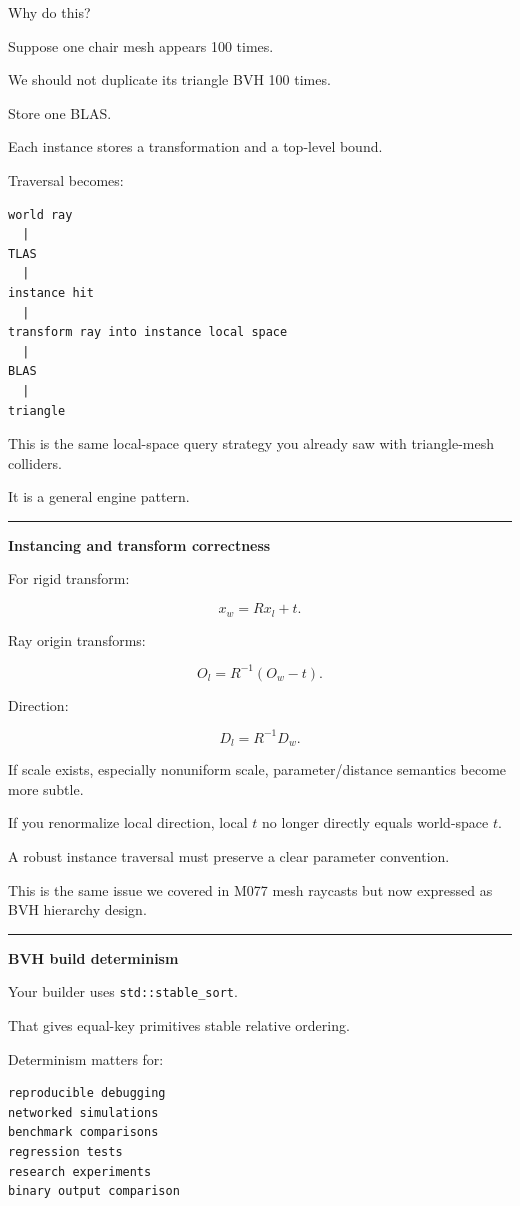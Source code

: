 Why do this?

Suppose one chair mesh appears 100 times.

We should not duplicate its triangle BVH 100 times.

Store one BLAS.

Each instance stores a transformation and a top-level bound.

Traversal becomes:

\begin{verbatim}
world ray
  |
TLAS
  |
instance hit
  |
transform ray into instance local space
  |
BLAS
  |
triangle
\end{verbatim}

This is the same local-space query strategy you already saw with triangle-mesh colliders.

It is a general engine pattern.

\begin{center}\rule{0.5\linewidth}{0.5pt}\end{center}

\textbf{Instancing and transform correctness}

For rigid transform:

\[
x_w=Rx_l+t.
\]

Ray origin transforms:

\[
O_l=R^{-1}(O_w-t).
\]

Direction:

\[
D_l=R^{-1}D_w.
\]

If scale exists, especially nonuniform scale, parameter/distance semantics become more subtle.

If you renormalize local direction, local \(t\) no longer directly equals world-space \(t\).

A robust instance traversal must preserve a clear parameter convention.

This is the same issue we covered in M077 mesh raycasts but now expressed as BVH hierarchy design.

\begin{center}\rule{0.5\linewidth}{0.5pt}\end{center}

\textbf{BVH build determinism}

Your builder uses \texttt{std::stable\_sort}.

That gives equal-key primitives stable relative ordering.

Determinism matters for:

\begin{verbatim}
reproducible debugging
networked simulations
benchmark comparisons
regression tests
research experiments
binary output comparison
\end{verbatim}

